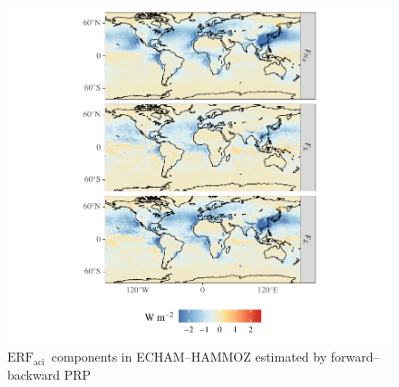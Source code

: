 \documentclass[acp, manuscript]{copernicus}\usepackage[]{graphicx}\usepackage[]{color}
\newcommand\erfaci{\ensuremath{\text{ERF}_\text{aci}}}
\begin{document}




\clearpage



%
%
\begin{figure}[t]
  \centering



{\centering \includegraphics[width=\textwidth]{figure/erf-prp-erf-1} 

}



\caption{\erfaci\ components in ECHAM--HAMMOZ estimated by forward--backward PRP}
\label{fig:echam-ham}
\end{figure}
\end{document}
